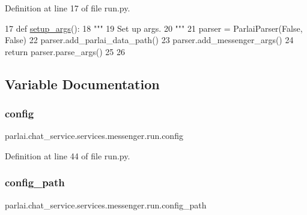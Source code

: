 Definition at line 17 of file run.\+py.


\begin{DoxyCode}
17 \textcolor{keyword}{def }\hyperlink{namespaceparlai_1_1tasks_1_1talkthewalk_1_1run_a3534e8afa0a4dc25a6e02740fa35ac84}{setup\_args}():
18     \textcolor{stringliteral}{"""}
19 \textcolor{stringliteral}{    Set up args.}
20 \textcolor{stringliteral}{    """}
21     parser = ParlaiParser(\textcolor{keyword}{False}, \textcolor{keyword}{False})
22     parser.add\_parlai\_data\_path()
23     parser.add\_messenger\_args()
24     \textcolor{keywordflow}{return} parser.parse\_args()
25 
26 
\end{DoxyCode}


\subsection{Variable Documentation}
\mbox{\label{namespaceparlai_1_1chat__service_1_1services_1_1messenger_1_1run_aa5dcaaace4024e255bfdbebea518be6d}} 
\subsubsection{\texorpdfstring{config}{config}}
{\footnotesize\ttfamily parlai.\+chat\+\_\+service.\+services.\+messenger.\+run.\+config}



Definition at line 44 of file run.\+py.

\mbox{\label{namespaceparlai_1_1chat__service_1_1services_1_1messenger_1_1run_a6c755aedbbebd4467c65fe142cbd73a5}} 
\subsubsection{\texorpdfstring{config\+\_\+path}{config\_path}}
{\footnotesize\ttfamily parlai.\+chat\+\_\+service.\+services.\+messenger.\+run.\+config\+\_\+path}



